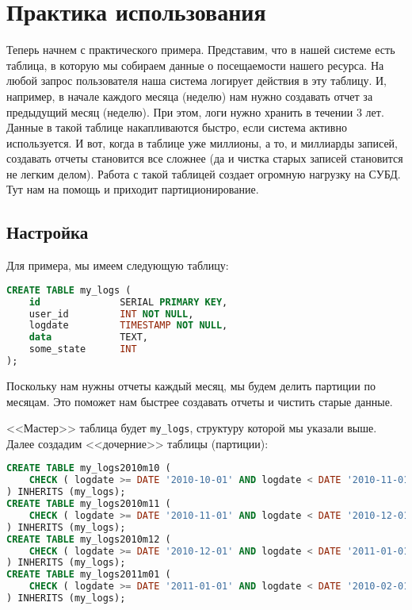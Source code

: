 \section{Практика использования}

Теперь начнем с практического примера. Представим, что в нашей системе есть таблица, в которую мы собираем данные о посещаемости нашего ресурса. На любой запрос пользователя наша система логирует действия в эту таблицу. И, например, в начале каждого месяца (неделю) нам нужно создавать отчет за предыдущий месяц (неделю). При этом, логи нужно хранить в течении 3 лет. Данные в такой таблице накапливаются быстро, если система активно используется. И вот, когда в таблице уже миллионы, а то, и миллиарды записей, создавать отчеты становится все сложнее (да и чистка старых записей становится не легким делом). Работа с такой таблицей создает огромную нагрузку на СУБД. Тут нам на помощь и приходит партиционирование.

\subsection{Настройка}

Для примера, мы имеем следующую таблицу:

\begin{lstlisting}[language=SQL,label=lst:partitioning2,caption=<<Мастер>> таблица]
CREATE TABLE my_logs (
    id              SERIAL PRIMARY KEY,
    user_id         INT NOT NULL,
    logdate         TIMESTAMP NOT NULL,
    data            TEXT,
    some_state      INT
);
\end{lstlisting}

Поскольку нам нужны отчеты каждый месяц, мы будем делить партиции по месяцам. Это поможет нам быстрее создавать отчеты и чистить старые данные.

<<Мастер>> таблица будет \lstinline!my_logs!, структуру которой мы указали выше. Далее создадим <<дочерние>> таблицы (партиции):

\begin{lstlisting}[language=SQL,label=lst:partitioning3,caption=<<Дочерние>> таблицы]
CREATE TABLE my_logs2010m10 (
    CHECK ( logdate >= DATE '2010-10-01' AND logdate < DATE '2010-11-01' )
) INHERITS (my_logs);
CREATE TABLE my_logs2010m11 (
    CHECK ( logdate >= DATE '2010-11-01' AND logdate < DATE '2010-12-01' )
) INHERITS (my_logs);
CREATE TABLE my_logs2010m12 (
    CHECK ( logdate >= DATE '2010-12-01' AND logdate < DATE '2011-01-01' )
) INHERITS (my_logs);
CREATE TABLE my_logs2011m01 (
    CHECK ( logdate >= DATE '2011-01-01' AND logdate < DATE '2010-02-01' )
) INHERITS (my_logs);
\end{lstlisting}

